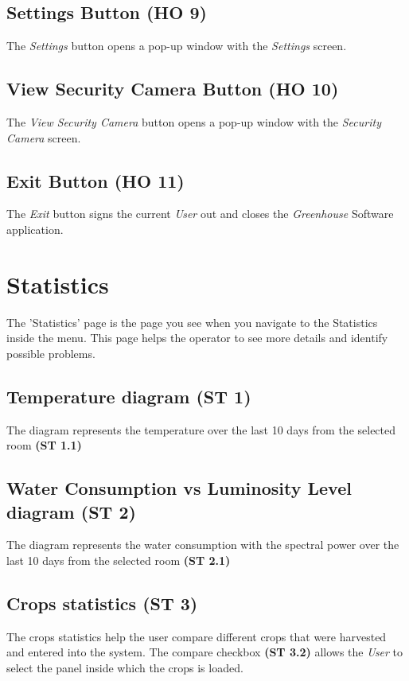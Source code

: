 \subsection{Settings Button (HO 9)}
The \emph{Settings} button opens a pop-up window with the \emph{Settings}
screen.

\subsection{View Security Camera Button (HO 10)}
The \emph{View Security Camera} button opens a pop-up window with the
\emph{Security Camera} screen.

\subsection{Exit Button (HO 11)}
The \emph{Exit} button signs the current \emph{User} out and closes the
\emph{Greenhouse} Software application.


\newpage
\section{Statistics}
\label{sec:appendix_Statistics}
\mbox{} \par
\noindent{}

The 'Statistics' page is the  page you see when you navigate to the Statistics
inside the menu. This page helps the operator to see more details and identify
possible problems.

\subsection{Temperature diagram (ST 1)}
The diagram represents the temperature over the last 10 days from the selected
room \textbf{(ST 1.1)}

\subsection{Water Consumption vs Luminosity Level diagram (ST 2)}
The diagram represents the water consumption with the spectral power over 
the last 10 days from the selected room \textbf{(ST 2.1)}

\subsection{Crops statistics (ST 3)}
The crops statistics help the user compare different crops that were harvested and entered into the system.
The compare checkbox \textbf{(ST 3.2)} allows the \emph{User} to select the
panel inside which the crops is loaded.

